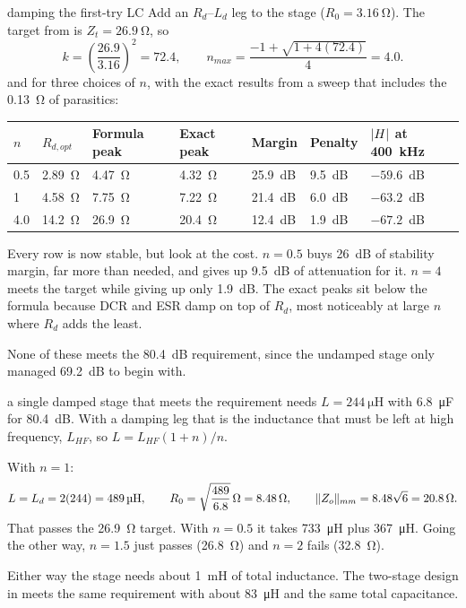 \begin{examplebox}[label=ex:damp-first-try]{damping the first-try LC}
	Add an $R_d$--$L_d$ leg to the  stage
	($R_0 = \qty{3.16}{\ohm}$). The target from  is
	$Z_t = \qty{26.9}{\ohm}$, so
	\[
		k = \left(\frac{26.9}{3.16}\right)^2 = 72.4, \qquad
		n_{max} = \frac{-1 + \sqrt{1 + 4(72.4)}}{4} = 4.0.
	\]
	 and  for three choices of $n$, with the
	exact results from a sweep that includes the \qty{0.13}{\ohm} of parasitics:

	\begin{center}
		\small
		\begin{tabular}{@{}lllllll@{}}
			\toprule
			$n$   & $R_{d,opt}$      & Formula peak     & Exact peak       & Margin  & Penalty & $\lvert H\rvert$ at \qty{400}{\kHz} \\
			\midrule
			0.5   & \qty{2.89}{\ohm} & \qty{4.47}{\ohm} & \qty{4.32}{\ohm} & 25.9~dB & 9.5~dB  & $-59.6$~dB                   \\
			1     & \qty{4.58}{\ohm} & \qty{7.75}{\ohm} & \qty{7.22}{\ohm} & 21.4~dB & 6.0~dB  & $-63.2$~dB                   \\
			4.0   & \qty{14.2}{\ohm} & \qty{26.9}{\ohm} & \qty{20.4}{\ohm} & 12.4~dB & 1.9~dB  & $-67.2$~dB                   \\
			\bottomrule
		\end{tabular}
	\end{center}

	Every row is now stable, but look at the cost. $n = 0.5$ buys 26~dB of
	stability margin, far more than needed, and gives up 9.5~dB of attenuation
	for it. $n = 4$ meets the target while giving up only 1.9~dB.
	The exact peaks sit below the formula because DCR and ESR damp on top of
	$R_d$, most noticeably at large $n$ where $R_d$ adds the least.

	None of these meets the 80.4~dB requirement, since the undamped stage only
	managed 69.2~dB to begin with.
\end{examplebox}

\begin{examplebox}[label=ex:single-damped]{a single damped stage that meets the requirement}
	 needs $L = \qty{244}{\micro\henry}$ with
	\qty{6.8}{\micro\farad} for 80.4~dB. With a damping leg that is the
	inductance that must be left at high frequency, $L_{HF}$, so
	$L = L_{HF}(1+n)/n$.

	With $n = 1$:
	\[
		L = L_d = 2(244) = \qty{489}{\micro\henry}, \qquad
		R_0 = \sqrt{\frac{489}{6.8}}\,\Omega = \qty{8.48}{\ohm}, \qquad
		\norm{\Zo}_{mm} = 8.48\sqrt{6} = \qty{20.8}{\ohm}.
	\]
	That passes the \qty{26.9}{\ohm} target. With $n = 0.5$ it takes
	\qty{733}{\micro\henry} plus \qty{367}{\micro\henry}. Going the other way,
	$n = 1.5$ just passes (\qty{26.8}{\ohm}) and $n = 2$ fails (\qty{32.8}{\ohm}).

	Either way the stage needs about \qty{1}{\milli\henry} of total inductance.
	The two-stage design in  meets the same requirement with
	about \qty{83}{\micro\henry} and the same total capacitance.
\end{examplebox}
